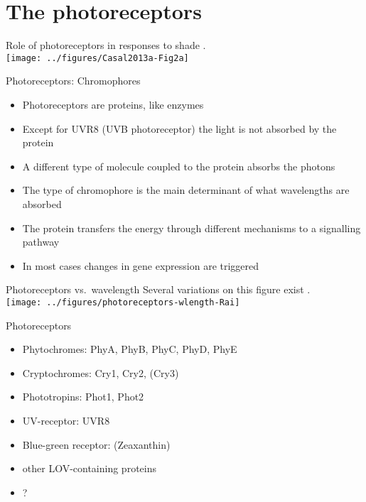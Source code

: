 \documentclass[10pt]{beamer}\usepackage[]{graphicx}\usepackage[]{color}
\begin{document}
\section{The photoreceptors}

\begin{frame}{Role of photoreceptors in responses to shade}{}
    {\footnotesize \autocite[from][]{Casal2013a}.\\}
    \texttt{[image: ../figures/Casal2013a-Fig2a]}
\end{frame}

\begin{frame}{Photoreceptors: Chromophores}
  \begin{itemize}
    \item Photoreceptors are proteins, like enzymes
    \item Except for UVR8 (UVB photoreceptor) the light is not absorbed by the protein
    \item A different type of molecule coupled to the protein absorbs the photons
    \item The type of chromophore is the main determinant of what wavelengths are absorbed
    \item The protein transfers the energy through different mechanisms to a signalling pathway
    \item In most cases changes in gene expression are triggered
  \end{itemize}
\end{frame}

\begin{frame}{Photoreceptors vs.\ wavelength}{}
    {\footnotesize Several variations on this figure exist \autocite[from][]{Rai2020}.\\}
    \texttt{[image: ../figures/photoreceptors-wlength-Rai]}
\end{frame}

\begin{frame}{Photoreceptors}
    \begin{itemize}
            \item Phytochromes: PhyA, PhyB, PhyC, PhyD, PhyE
            \item Cryptochromes: Cry1, Cry2, (Cry3)
            \item Phototropins: Phot1, Phot2
            \item UV-receptor: UVR8
            \item Blue-green receptor: (Zeaxanthin)
            \item other LOV-containing proteins
            \item ?
    \end{itemize}
\end{frame}
\end{document}
